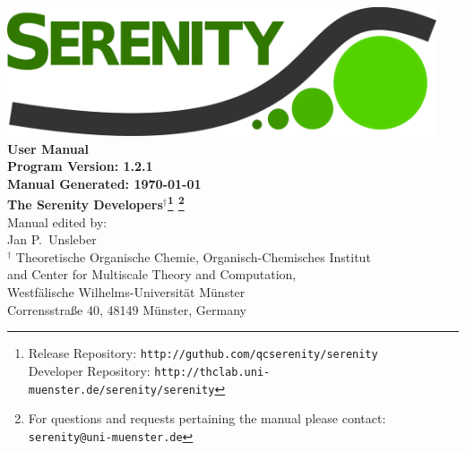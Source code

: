 \documentclass[bibliography=totocnumbered,a4paper,10pt]{scrartcl}
\begin{document}
\thispagestyle{empty}
\begin{center}
\vspace*{1cm}
\includegraphics[width=0.95\textwidth]{./figs/SerenityLogo.png}\\
\vspace{2cm}
{\LARGE\textbf{
User Manual
}}\\
\vspace{1cm}
{\large\textbf{
Program Version: 1.2.1\\
Manual Generated: \today
}}\\
\vspace{2cm}
{\large\textbf{ 
The Serenity Developers$^{\dagger}$\footnote{Release Repository: \texttt{http://guthub.com/qcserenity/serenity}\\
                                             Developer Repository: \texttt{http://thclab.uni-muenster.de/serenity/serenity}}
\footnote{For questions and requests pertaining the manual please contact:\\ \texttt{serenity@uni-muenster.de}}
}}\\
\vspace{2cm}
{\large Manual edited by: \\
Jan P.\ Unsleber
}
\\[2ex]

$^{\dagger}$ Theoretische Organische Chemie,
Organisch-Chemisches Institut \\
and Center for Multiscale Theory and Computation,\\
Westf\"alische Wilhelms-Universit\"at M\"unster\\
Corrensstra{\ss}e 40, 48149 M\"unster, Germany\\[2ex]

\vfill
\end{center}
\newpage
{}
\setcounter{page}{1}
\tableofcontents

\newpage
{}
\setcounter{page}{1}
\end{document}
